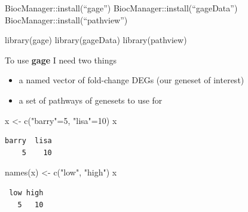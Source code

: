 \documentclass[
  letterpaper,
  DIV=11,
  numbers=noendperiod]{scrartcl}
\newenvironment{Shaded}{\begin{snugshade}}{\end{snugshade}}
\newcommand{\DecValTok}[1]{\textcolor[rgb]{0.68,0.00,0.00}{#1}}
\newcommand{\FunctionTok}[1]{\textcolor[rgb]{0.28,0.35,0.67}{#1}}
\newcommand{\NormalTok}[1]{\textcolor[rgb]{0.00,0.23,0.31}{#1}}
\newcommand{\OtherTok}[1]{\textcolor[rgb]{0.00,0.23,0.31}{#1}}
\newcommand{\SpecialCharTok}[1]{\textcolor[rgb]{0.37,0.37,0.37}{#1}}
\newcommand{\StringTok}[1]{\textcolor[rgb]{0.13,0.47,0.30}{#1}}
\providecommand{\tightlist}{%
  \setlength{\itemsep}{0pt}\setlength{\parskip}{0pt}}
\begin{document}
BiocManager::install(``gage'') BiocManager::install(``gageData'')
BiocManager::install(``pathview'')

\begin{Shaded}
\begin{Highlighting}[]
\FunctionTok{library}\NormalTok{(gage)}
\FunctionTok{library}\NormalTok{(gageData)}
\FunctionTok{library}\NormalTok{(pathview)}
\end{Highlighting}
\end{Shaded}

To use \textbf{gage} I need two things

\begin{itemize}
\tightlist
\item
  a named vector of fold-change DEGs (our geneset of interest)
\item
  a set of pathways of genesets to use for
\end{itemize}

\begin{Shaded}
\begin{Highlighting}[]
\NormalTok{x }\OtherTok{\textless{}{-}} \FunctionTok{c}\NormalTok{(}\StringTok{"barry"}\OtherTok{=}\DecValTok{5}\NormalTok{, }\StringTok{"lisa"}\OtherTok{=}\DecValTok{10}\NormalTok{)}
\NormalTok{x}
\end{Highlighting}
\end{Shaded}

\begin{verbatim}
barry  lisa 
    5    10 
\end{verbatim}

\begin{Shaded}
\begin{Highlighting}[]
\FunctionTok{names}\NormalTok{(x) }\OtherTok{\textless{}{-}} \FunctionTok{c}\NormalTok{(}\StringTok{"low"}\NormalTok{, }\StringTok{"high"}\NormalTok{)}
\NormalTok{x}
\end{Highlighting}
\end{Shaded}

\begin{verbatim}
 low high 
   5   10 
\end{verbatim}

\begin{Shaded}
\end{Shaded}
\end{document}
